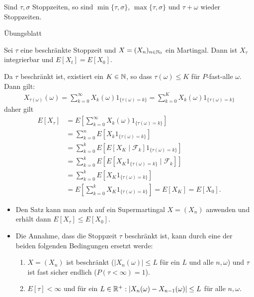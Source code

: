 \documentclass[a4paper,twoside,DIV15,BCOR12mm]{scrbook}
\newcommand{\cF}{\mathcal F}
\begin{document}
\begin{lemma}
Sind $\tau,\sigma$ Stoppzeiten, so sind $\min\{\tau, \sigma\}$, $\max\{\tau, \sigma\}$ und $\tau + \omega$ wieder Stoppzeiten.
\end{lemma}
\begin{beweis}
Übungsblatt
\end{beweis}

\begin{satz}
Sei $\tau$ eine beschränkte Stoppzeit und $X=(X_n)_{n\in\mathbb{N}_0}$ ein Martingal. Dann ist $X_\tau$ integrierbar und $E[X_t] = E[X_0]$.
\end{satz}

\begin{beweis}
Da $\tau$ beschränkt ist, existiert ein $K\in\mathbb{N}$, so dass $\tau(\omega)\le K$ für $P$-fast-alle $\omega$. Dann gilt:
\begin{align*}
X_{\tau(\omega)}(\omega) = \sum_{k=0}^\infty X_k(\omega) 1_{\{\tau(\omega) = k\}} = \sum_{k=0}^K X_k(\omega) 1_{\{\tau(\omega) = k\}} 
\end{align*}
daher gilt
\begin{align*}
E[X_\tau] &= E[\sum_{k=0}^\infty X_k(\omega) 1_{\{\tau(\omega) = k\}}] \\
&= \sum_{k=0}^n E[X_k 1_{\{\tau(\omega) = k\}}] \\
&= \sum_{k=0}^k E[ E[X_K\mid\cF_k]  1_{\{\tau(\omega) = k\}}] \\
&= \sum_{k=0}^k E[ E[X_K 1_{\{\tau(\omega) = k\}}\mid\cF_k] ] \\
&= \sum_{k=0}^k E[X_K 1_{\{\tau(\omega) = k\}} ] \\
&= E[\sum_{k=0}^k X_K 1_{\{\tau(\omega) = k\}} ] = E[X_K] = E [X_0].
\end{align*}
\end{beweis}

\begin{bemerkung}
\begin{itemize}
\item Den Satz kann man auch auf ein Supermartingal $X=(X_n)$ anwenden und erhält dann $E[X_\tau]\leq E[X_0]$.
\item Die Annahme, dass die Stoppzeit $\tau$ beschränkt ist, kann durch eine der beiden folgenden Bedingungen ersetzt werde:
\begin{enumerate}
\item $X=(X_n)$ ist beschränkt ($|X_n(\omega)| \leq L$ für ein $L$ und alle $n, \omega$) und $\tau$ ist fast sicher endlich ($P(\tau < \infty)=1$).
\item $E[\tau]<\infty$ und für ein $L \in \mathbb{R}^+:|X_n(\omega)-X_{n-1}(\omega)|\leq L$ für alle $n,\omega$.
\end{enumerate}
\end{itemize}
\end{bemerkung}
\end{document}
